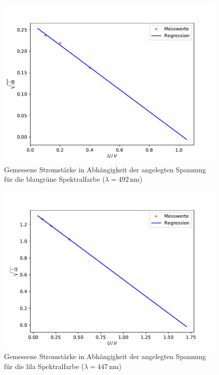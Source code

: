 \begin{figure}
  \centering
  \includegraphics[scale=0.7]{blaugrün.pdf}
  \caption{Gemessene Stromstärke in Abhängigkeit der angelegten Spannung für die blaugrüne Spektralfarbe ($\lambda=492$\,$\si{\nano\meter}$)}
  \label{fig:bg}
\end{figure}
\begin{figure}
  \centering
  \includegraphics[scale=0.7]{lila.pdf}
  \caption{Gemessene Stromstärke in Abhängigkeit der angelegten Spannung für die lila Spektralfarbe ($\lambda=447$\,$\si{\nano\meter}$)}
  \label{fig:l}
\end{figure}
